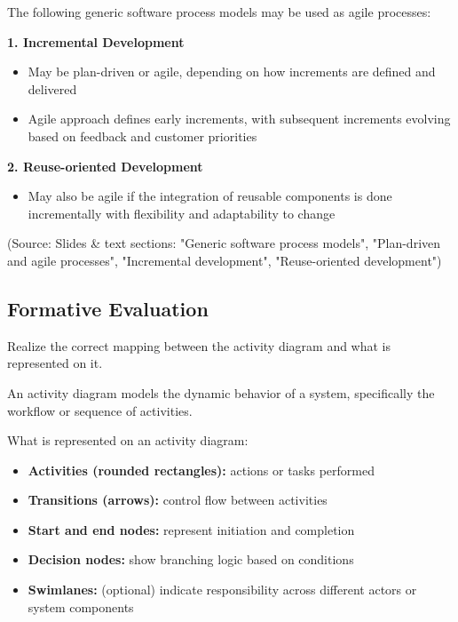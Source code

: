 \documentclass[12pt]{article}
\begin{document}
The following generic software process models may be used as agile processes:

\textbf{1. Incremental Development}
\begin{itemize}
    \item May be plan-driven or agile, depending on how increments are defined and delivered
    \item Agile approach defines early increments, with subsequent increments evolving based on feedback and customer priorities
\end{itemize}

\textbf{2. Reuse-oriented Development}
\begin{itemize}
    \item May also be agile if the integration of reusable components is done incrementally with flexibility and adaptability to change
\end{itemize}

(Source: Slides \& text sections: "Generic software process models", "Plan-driven and agile processes", "Incremental development", "Reuse-oriented development")

\subsection{Formative Evaluation}

\begin{questionbox}
Realize the correct mapping between the activity diagram and what is represented on it.
\end{questionbox}

An activity diagram models the dynamic behavior of a system, specifically the workflow or sequence of activities.

What is represented on an activity diagram:
\begin{itemize}
    \item \textbf{Activities (rounded rectangles):} actions or tasks performed
    \item \textbf{Transitions (arrows):} control flow between activities
    \item \textbf{Start and end nodes:} represent initiation and completion
    \item \textbf{Decision nodes:} show branching logic based on conditions
    \item \textbf{Swimlanes:} (optional) indicate responsibility across different actors or system components
\end{itemize}
\end{document}
